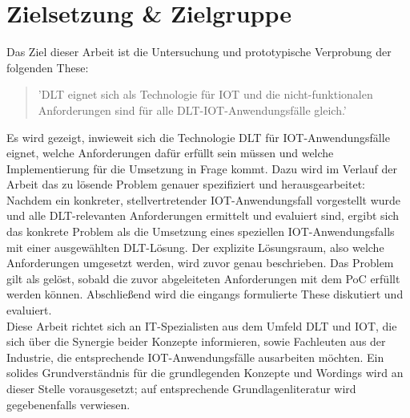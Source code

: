 %
%
\section{Zielsetzung \& Zielgruppe}
\label{sec:intro:goal}
Das Ziel dieser Arbeit ist die Untersuchung und prototypische Verprobung der folgenden These:
\begin{quote}
  '\ac{DLT} eignet sich als Technologie für \ac{IOT} und die nicht-funktionalen Anforderungen sind für alle \ac{DLT}-\ac{IOT}-Anwendungsfälle gleich.'
\end{quote}
Es wird gezeigt, inwieweit sich die Technologie \ac{DLT} für \ac{IOT}-Anwendungsfälle eignet, welche Anforderungen dafür erfüllt sein müssen und welche Implementierung für die Umsetzung in Frage kommt. Dazu wird im Verlauf der Arbeit das zu lösende Problem genauer spezifiziert und herausgearbeitet: Nachdem ein konkreter, stellvertretender \ac{IOT}-Anwendungsfall vorgestellt wurde und alle \ac{DLT}-relevanten Anforderungen ermittelt und evaluiert sind, ergibt sich das konkrete Problem als die Umsetzung eines speziellen \ac{IOT}-Anwendungsfalls mit einer ausgewählten \ac{DLT}-Lösung. Der explizite Lösungsraum, also welche Anforderungen umgesetzt werden, wird zuvor genau beschrieben. Das Problem gilt als gelöst, sobald die zuvor abgeleiteten Anforderungen mit dem \ac{PoC} erfüllt werden können. Abschließend wird die eingangs formulierte These diskutiert und evaluiert.\\
Diese Arbeit richtet sich an IT-Spezialisten aus dem Umfeld \ac{DLT} und \ac{IOT}, die sich über die Synergie beider Konzepte informieren, sowie Fachleuten aus der Industrie, die entsprechende \ac{IOT}-Anwendungsfälle ausarbeiten möchten. Ein solides Grundverständnis für die grundlegenden Konzepte und Wordings wird an dieser Stelle vorausgesetzt; auf entsprechende Grundlagenliteratur wird gegebenenfalls verwiesen.

%
%

